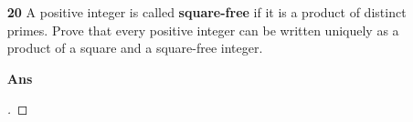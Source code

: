 \documentclass[paper=usletter, fontsize=12pt]{article}
\begin{document}
\begin{itemize}
\begin{itemize}
            \item[\textbf{20}] A positive integer is called \textbf{square-free} if it is a product of distinct primes. Prove that every
            positive integer can be written uniquely as a product of a square
            and a square-free integer.
            \item[\textbf{Ans}]
            \begin{proof}[\unskip\nopunct]
            \end{proof}
            \vspace{0.2in}

        \end{itemize}

    \end{itemize}
\end{document}

